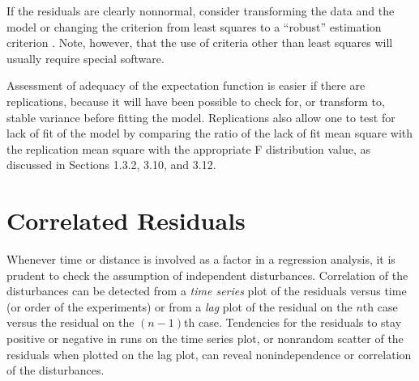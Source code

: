 If the residuals are clearly nonnormal, consider
transforming the data and the model \cite{carr:rupp:1984} or
changing the criterion from least squares to a ``robust''
estimation criterion
\cite{hube:1981}.
Note, however, that the use of
criteria other than least squares will usually require special software.

Assessment of adequacy of the expectation function is easier if
there are replications, because it will have been
possible to check for, or transform to, stable variance before
fitting the model.
Replications also allow one to test for lack of fit of the model
by comparing the ratio of the lack of fit mean square with the
replication mean square with the appropriate F distribution value,
as discussed in Sections 1.3.2, 3.10, and 3.12.

\section{Correlated Residuals}

Whenever time or distance is involved as a factor in a regression analysis,
it is prudent to check the assumption of independent disturbances.
Correlation of the disturbances can be detected from
a \emph{time series}
plot of the residuals versus time (or
order of the experiments) or from a \emph{lag} plot of the
residual on the $n$th case versus the residual on the
$(n - 1 )$th case.
Tendencies for the residuals to stay positive or negative in runs
on the time series plot, or nonrandom scatter of the residuals when
plotted on the lag plot, can reveal nonindependence or
correlation of the disturbances.

